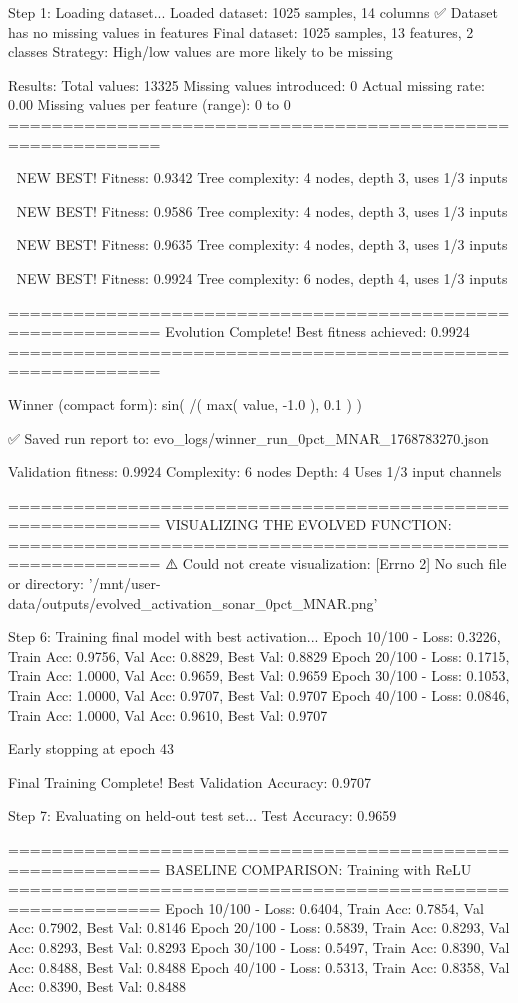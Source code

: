 Step 1: Loading dataset...
Loaded dataset: 1025 samples, 14 columns
✅ Dataset has no missing values in features
Final dataset: 1025 samples, 13 features, 2 classes
Strategy: High/low values are more likely to be missing

Results:
  Total values: 13325
  Missing values introduced: 0
  Actual missing rate: 0.00%
  Missing values per feature (range): 0 to 0
============================================================


🎯 NEW BEST! Fitness: 0.9342
Tree complexity: 4 nodes, depth 3, uses 1/3 inputs

🎯 NEW BEST! Fitness: 0.9586
Tree complexity: 4 nodes, depth 3, uses 1/3 inputs

🎯 NEW BEST! Fitness: 0.9635
Tree complexity: 4 nodes, depth 3, uses 1/3 inputs

🎯 NEW BEST! Fitness: 0.9924
Tree complexity: 6 nodes, depth 4, uses 1/3 inputs

============================================================
Evolution Complete!
Best fitness achieved: 0.9924
============================================================

Winner (compact form):
 sin(
  /(
    max(
      value,
      -1.0
    ),
    0.1
  )
)

✅ Saved run report to: evo_logs/winner_run_0pct_MNAR_1768783270.json

Validation fitness: 0.9924
Complexity: 6 nodes
Depth: 4
Uses 1/3 input channels

============================================================
VISUALIZING THE EVOLVED FUNCTION:
============================================================
⚠️ Could not create visualization: [Errno 2] No such file or directory: '/mnt/user-data/outputs/evolved_activation_sonar_0pct_MNAR.png'

Step 6: Training final model with best activation...
Epoch  10/100 - Loss: 0.3226, Train Acc: 0.9756, Val Acc: 0.8829, Best Val: 0.8829
Epoch  20/100 - Loss: 0.1715, Train Acc: 1.0000, Val Acc: 0.9659, Best Val: 0.9659
Epoch  30/100 - Loss: 0.1053, Train Acc: 1.0000, Val Acc: 0.9707, Best Val: 0.9707
Epoch  40/100 - Loss: 0.0846, Train Acc: 1.0000, Val Acc: 0.9610, Best Val: 0.9707

Early stopping at epoch 43

Final Training Complete!
Best Validation Accuracy: 0.9707

Step 7: Evaluating on held-out test set...
Test Accuracy: 0.9659

============================================================
BASELINE COMPARISON: Training with ReLU
============================================================
Epoch  10/100 - Loss: 0.6404, Train Acc: 0.7854, Val Acc: 0.7902, Best Val: 0.8146
Epoch  20/100 - Loss: 0.5839, Train Acc: 0.8293, Val Acc: 0.8293, Best Val: 0.8293
Epoch  30/100 - Loss: 0.5497, Train Acc: 0.8390, Val Acc: 0.8488, Best Val: 0.8488
Epoch  40/100 - Loss: 0.5313, Train Acc: 0.8358, Val Acc: 0.8390, Best Val: 0.8488


